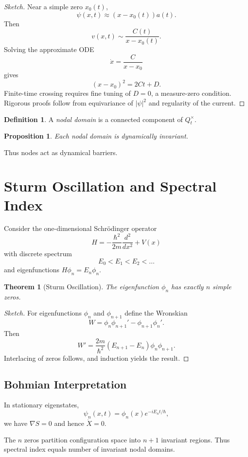 \documentclass[11pt]{article}
\theoremstyle{plain}
\newtheorem{theorem}{Theorem}
\newtheorem{proposition}{Proposition}
\theoremstyle{definition}
\newtheorem{definition}{Definition}
\begin{document}
\begin{proof}[Sketch]
Near a simple zero $x_0(t)$,
\[
\psi(x,t) \approx (x-x_0(t)) a(t).
\]
Then
\[
v(x,t) \sim \frac{C(t)}{x-x_0(t)}.
\]
Solving the approximate ODE
\[
\dot x = \frac{C}{x-x_0}
\]
gives
\[
(x-x_0)^2 = 2Ct + D.
\]
Finite-time crossing requires fine tuning of $D=0$, a measure-zero condition.
Rigorous proofs follow from equivariance of $|\psi|^2$ and regularity of the current.
\end{proof}

\begin{definition}
A \emph{nodal domain} is a connected component of $Q_t^\times$.
\end{definition}

\begin{proposition}
Each nodal domain is dynamically invariant.
\end{proposition}

Thus nodes act as dynamical barriers.

\section{Sturm Oscillation and Spectral Index}

Consider the one-dimensional Schrödinger operator
\[
H = -\frac{\hbar^2}{2m}\frac{d^2}{dx^2} + V(x)
\]
with discrete spectrum
\[
E_0 < E_1 < E_2 < \dots
\]
and eigenfunctions $H\phi_n = E_n\phi_n$.

\begin{theorem}[Sturm Oscillation]
The eigenfunction $\phi_n$ has exactly $n$ simple zeros.
\end{theorem}

\begin{proof}[Sketch]
For eigenfunctions $\phi_n$ and $\phi_{n+1}$ define the Wronskian
\[
W = \phi_n \phi_{n+1}' - \phi_{n+1}\phi_n'.
\]
Then
\[
W' = \frac{2m}{\hbar^2}(E_{n+1}-E_n)\phi_n\phi_{n+1}.
\]
Interlacing of zeros follows, and induction yields the result.
\end{proof}

\subsection*{Bohmian Interpretation}

In stationary eigenstates,
\[
\psi_n(x,t) = \phi_n(x)e^{-iE_nt/\hbar},
\]
we have $\nabla S=0$ and hence $\dot X=0$.

The $n$ zeros partition configuration space into $n+1$ invariant regions.
Thus spectral index equals number of invariant nodal domains.
\end{document}
